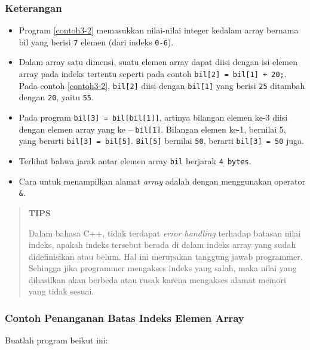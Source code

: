 \subsubsection*{Keterangan}

\begin{itemize}

\item
 Program \ref{contoh3-2} memasukkan nilai-nilai integer kedalam array bernama
 bil yang berisi \texttt{7} elemen (dari indeks \texttt{0-6}).
\item
 Dalam array satu dimensi, suatu elemen array dapat diisi dengan isi
 elemen array pada indeks tertentu seperti pada contoh
 \texttt{bil{[}2{]}\ =\ bil{[}1{]}\ +\ 20;}. Pada contoh \ref{contoh3-2},
 \texttt{bil{[}2{]}} diisi dengan \texttt{bil{[}1{]}} yang berisi
 \texttt{25} ditambah dengan \texttt{20}, yaitu \texttt{55}.
\item
 Pada program \texttt{bil{[}3{]}\ =\ bil{[}bil{[}1{]}{]}}, artinya
 bilangan elemen ke-3 diisi dengan elemen array yang ke --
 \texttt{bil{[}1{]}}. Bilangan elemen ke-1, bernilai 5, yang berarti
 \texttt{bil{[}3{]}\ =\ bil{[}5{]}}. \texttt{Bil{[}5{]}} bernilai
 \texttt{50}, berarti \texttt{bil{[}3{]}\ =\ 50} juga.
\item
 Terlihat bahwa jarak antar elemen array \texttt{bil} berjarak
 \texttt{4\ bytes}.
\item
 Cara untuk menampilkan alamat \emph{array} adalah dengan menggunakan
 operator \texttt{\&}.
\end{itemize}
\begin{quotation}
{\LARGE {}} \textbf{TIPS}

Dalam
bahasa C++, tidak terdapat \emph{error handling} terhadap batasan nilai
indeks, apakah indeks tersebut berada di dalam indeks array yang sudah
didefinisikan atau belum. Hal ini merupakan tanggung jawab programmer.
Sehingga jika programmer mengakses indeks yang salah, maka nilai yang
dihasilkan akan berbeda atau rusak karena mengakses alamat memori yang
tidak sesuai.
\end{quotation}


\subsubsection*{Contoh Penanganan Batas Indeks Elemen Array}

Buatlah program beikut ini:




